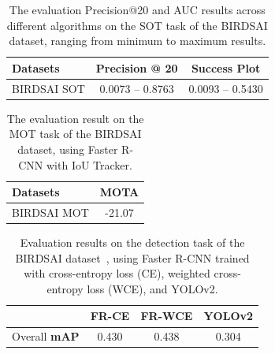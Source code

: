 \documentclass[11pt]{article}
\begin{document}
\begin{table}[h]
\centering
\begin{tabular}{|l|c|c|}
\hline
\textbf{Datasets} & \textbf{Precision @ 20} & \textbf{Success Plot} \\
\hline
BIRDSAI SOT & 0.0073 -- 0.8763 & 0.0093 -- 0.5430 \\
\hline
\end{tabular}
\caption{The evaluation Precision@20 and AUC results across different algorithms on the SOT task of the BIRDSAI dataset\cite{bondi2020birdsai}, ranging from minimum to maximum results.}
\label{tab:birdsai_sot}
\end{table}

\begin{table}[h]
\centering
\begin{tabular}{|l|c|}
\hline
\textbf{Datasets} & \textbf{MOTA} \\
\hline
BIRDSAI MOT & -21.07 \\
\hline
\end{tabular}
\caption{The evaluation result on the MOT task of the BIRDSAI dataset\cite{bondi2020birdsai}, using Faster R-CNN with IoU Tracker.}
\label{tab:birdsai_mot}
\end{table}

\begin{table}[h]
\centering
\begin{tabular}{|l|c|c|c|}
\hline
& FR-CE & FR-WCE & YOLOv2 \\
\hline
Overall \textbf{mAP} & 0.430 & 0.438 & 0.304 \\
\hline
\end{tabular}
\caption{Evaluation results on the detection task of the BIRDSAI dataset~\cite{bondi2020birdsai}, 
using Faster R-CNN trained with cross-entropy loss (CE), 
weighted cross-entropy loss (WCE), and YOLOv2.}
\label{tab:birdsai_det}
\end{table}



\end{document}
